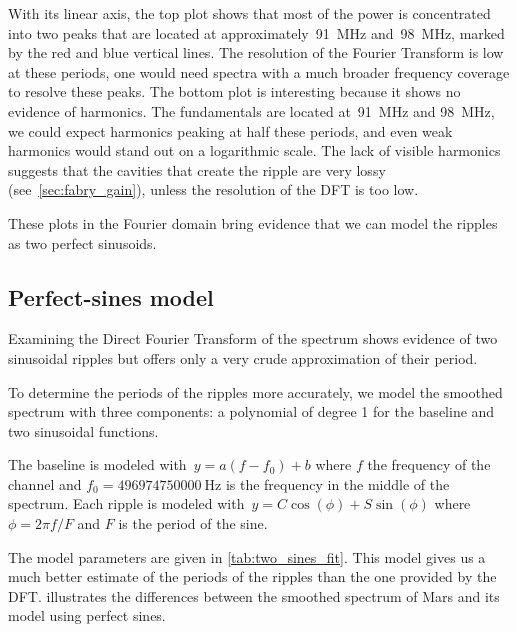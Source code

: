 With its linear axis, the top plot shows that most of the power is concentrated into two peaks that are located at approximately~\SI{91}{\mega\hertz} and~\SI{98}{\mega\hertz}, marked by the red and blue vertical lines.
The resolution of the Fourier Transform is low at these periods, one would need spectra with a much broader frequency coverage to resolve these peaks.
The bottom plot is interesting because it shows no evidence of harmonics.
The fundamentals are located at~\SI{91}{\mega\hertz} and \SI{98}{\mega\hertz}, we could expect harmonics peaking at half these periods, and even weak harmonics would stand out on a logarithmic scale.
The lack of visible harmonics suggests that the cavities that create the ripple are very lossy (see~\cref{sec:fabry_gain}), unless the resolution of the DFT is too low.

These plots in the Fourier domain bring evidence that we can model the ripples as two perfect sinusoids.




\subsection{Perfect-sines model}
\label{sec:perfect_sines_model}
Examining the Direct Fourier Transform of the spectrum shows evidence of two sinusoidal ripples but offers only a very crude approximation of their period.

To determine the periods of the ripples more accurately, we model the smoothed spectrum with three components: a polynomial of degree 1 for the baseline and two sinusoidal functions.

The baseline is modeled with~$y=a(f-f_0)+b$ where
$f$ the frequency of the channel and
$f_0=\SI{496974750000}{\hertz}$ is the frequency in the middle of the spectrum.
Each ripple is modeled with~$y = C \cos(\phi) + S \sin(\phi)$ where
$\phi = 2 \pi f / F$ and $F$ is the period of the sine.

The model parameters are given in \cref{tab:two_sines_fit}.
This model gives us a much better estimate of the periods of the ripples than the one provided by the DFT.
 illustrates the differences between the smoothed spectrum of Mars and its model using perfect sines.


